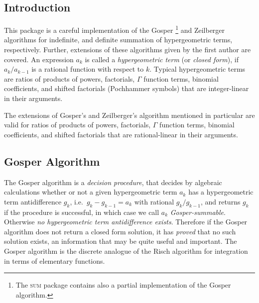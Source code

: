 
\subsection{Introduction}

\ifdefined{}\else
\newcommand{\funkdef}[3]{\left\{\begin{array}{cc}
                                #1 & \text{if $#2$ } \\
                                #3 & \text{otherwise}
                                \end{array}\right.}
\fi
This package is a careful implementation of the Gosper%
\footnote{The \textsc{sum} package contains also a partial implementation
of the Gosper algorithm.}
and Zeilberger algorithms for indefinite, and definite summation of
hypergeometric terms, respectively. Further, extensions of these algorithms
given by the first author are covered. An expression $a_k$ is called a
\textsl{hypergeometric term} (or \textsl{closed form}),
if $a_{k}/a_{k-1}$ is a rational function with respect to $k$.
Typical hypergeometric terms are ratios of products of powers, factorials,
$\Gamma$ function terms, binomial coefficients, and shifted factorials
(Pochhammer symbols) that are integer-linear in their arguments.

The extensions of Gosper's and Zeilberger's algorithm mentioned
in particular are valid for ratios of products of powers, factorials,
$\Gamma$ function terms, binomial coefficients, and shifted factorials
that are rational-linear in their arguments.

\subsection{Gosper Algorithm}

The Gosper algorithm \cite{Gosper:78} is a \textsl{decision procedure}, that
decides by algebraic calculations whether or not a given hypergeometric term
$a_k$ has a hypergeometric term antidifference $g_k$, i.e.\
$g_{k}-g_{k-1}=a_k$ with rational $g_k/g_{k-1}$,
and returns $g_k$ if the procedure is successful, in which
case we call $a_k$ \textsl{Gosper-summable}. Otherwise
\textsl{no hypergeometric term antidifference exists}. Therefore
if the Gosper algorithm does not return a closed form solution,
it has \textsl{proved} that no such solution exists, an information
that may be quite useful and important.
The Gosper algorithm is the discrete analogue of the Risch algorithm
for integration in terms of elementary functions.

